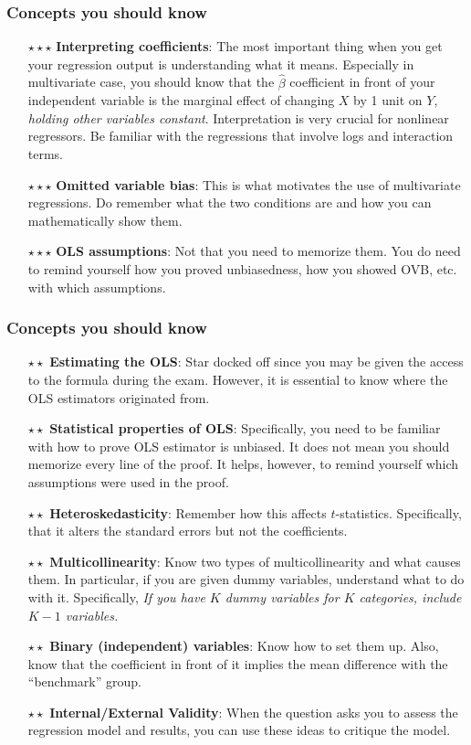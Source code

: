 \documentclass[aspectratio=169]{beamer}
\begin{document}
\begin{frame}
\frametitle{Concepts you should know}
\begin{itemize} 
\item[$\star\star\star$] \textbf{Interpreting coefficients}: The most important thing when you get your regression output is understanding what it means. Especially in multivariate case, you should know that the $\hat{\beta}$ coefficient in front of your independent variable is the marginal effect of changing $X$ by 1 unit on $Y$, \textit{holding other variables constant}. Interpretation is very crucial for nonlinear regressors. Be familiar with the regressions that involve logs and interaction terms. 
\item[$\star\star\star$]\textbf{Omitted variable bias}: This is what motivates the use of multivariate regressions. Do remember what the two conditions are and how you can mathematically show them.
\item[$\star\star\star$] \textbf{OLS assumptions}: Not that you need to memorize them. You do need to remind yourself how you proved unbiasedness, how you showed OVB, etc. with which assumptions. 
\end{itemize}
\end{frame}

\begin{frame}
\frametitle{Concepts you should know}
\begin{itemize} 
\item[$\star\star$] \textbf{Estimating the OLS}: Star docked off since you may be given the access to the formula during the exam. However, it is essential to know where the OLS estimators originated from. 
\item[$\star\star$] \textbf{Statistical properties of OLS}: Specifically, you need to be familiar with how to prove OLS estimator is unbiased. It does not mean you should memorize every line of the proof. It helps, however, to remind yourself which assumptions were used in the proof.
\item[$\star\star$]\textbf{Heteroskedasticity}: Remember how this affects $t$-statistics. Specifically, that it alters the standard errors but not the coefficients.  
\item[$\star\star$]\textbf{Multicollinearity}: Know two types of multicollinearity and what causes them. In particular, if you are given dummy variables, understand what to do with it. Specifically, \textit{If you have $K$ dummy variables for $K$ categories, include $K-1$ variables.}
\item[$\star\star$]\textbf{Binary (independent) variables}: Know how to set them up. Also, know that the coefficient in front of it implies the mean difference with the ``benchmark'' group.
\item[$\star\star$]\textbf{Internal/External Validity}: When the question asks you to assess the regression model and results, you can use these ideas to critique the model. 
\end{itemize}
\end{frame}
\end{document}
